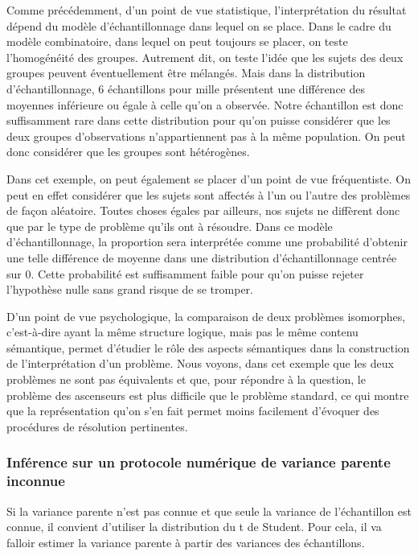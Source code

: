 \documentclass[]{book}
\theoremstyle{definition}
\theoremstyle{definition}
\theoremstyle{definition}
\theoremstyle{remark}
\begin{document}
Comme précédemment, d'un point de vue statistique, l'interprétation du
résultat dépend du modèle d'échantillonnage dans lequel on se place.
Dans le cadre du modèle combinatoire, dans lequel on peut toujours se
placer, on teste l'homogénéité des groupes. Autrement dit, on teste
l'idée que les sujets des deux groupes peuvent éventuellement être
mélangés. Mais dans la distribution d'échantillonnage, 6 échantillons
pour mille présentent une différence des moyennes inférieure ou égale à
celle qu'on a observée. Notre échantillon est donc suffisamment rare
dans cette distribution pour qu'on puisse considérer que les deux
groupes d'observations n'appartiennent pas à la même population. On peut
donc considérer que les groupes sont hétérogènes.

Dans cet exemple, on peut également se placer d'un point de vue
fréquentiste. On peut en effet considérer que les sujets sont affectés à
l'un ou l'autre des problèmes de façon aléatoire. Toutes choses égales
par ailleurs, nos sujets ne diffèrent donc que par le type de problème
qu'ils ont à résoudre. Dans ce modèle d'échantillonnage, la proportion
sera interprétée comme une probabilité d'obtenir une telle différence de
moyenne dans une distribution d'échantillonnage centrée sur 0. Cette
probabilité est suffisamment faible pour qu'on puisse rejeter
l'hypothèse nulle sans grand risque de se tromper.

D'un point de vue psychologique, la comparaison de deux problèmes
isomorphes, c'est-à-dire ayant la même structure logique, mais pas le
même contenu sémantique, permet d'étudier le rôle des aspects
sémantiques dans la construction de l'interprétation d'un problème. Nous
voyons, dans cet exemple que les deux problèmes ne sont pas équivalents
et que, pour répondre à la question, le problème des ascenseurs est plus
difficile que le problème standard, ce qui montre que la représentation
qu'on s'en fait permet moins facilement d'évoquer des procédures de
résolution pertinentes.

\hypertarget{inference-sur-un-protocole-numerique-de-variance-parente-inconnue}{%
\subsubsection{Inférence sur un protocole numérique de variance parente
inconnue}\label{inference-sur-un-protocole-numerique-de-variance-parente-inconnue}}

Si la variance parente n'est pas connue et que seule la variance de
l'échantillon est connue, il convient d'utiliser la distribution du t de
Student. Pour cela, il va falloir estimer la variance parente à partir
des variances des échantillons.
\end{document}
